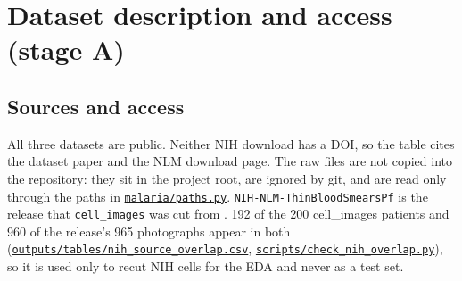 \documentclass[11pt,a4paper]{article}
\begin{document}
\section{Dataset description and access (stage A)}

\subsection{Sources and access}

All three datasets are public. Neither NIH download has a DOI, so the table cites the dataset paper and the NLM download page. The raw files are not copied into the repository: they sit in the project root, are ignored by git, and are read only through the paths in \href{https://gitlab.uvt.nl/capstone/2026-fall/u927271/-/blob/v1.0-final/malaria/paths.py}{\texttt{malaria/\allowbreak{}paths.\allowbreak{}py}}. \texttt{NIH-NLM-ThinBloodSmearsPf} is the release that \texttt{cell\_\allowbreak{}images} was cut from \citep{kassim2021}. 192 of the 200 cell\_\allowbreak{}images patients and 960 of the release's 965 photographs appear in both (\href{https://gitlab.uvt.nl/capstone/2026-fall/u927271/-/blob/v1.0-final/outputs/tables/nih_source_overlap.csv}{\texttt{outputs/\allowbreak{}tables/\allowbreak{}nih\_\allowbreak{}source\_\allowbreak{}overlap.\allowbreak{}csv}}, \href{https://gitlab.uvt.nl/capstone/2026-fall/u927271/-/blob/v1.0-final/scripts/check_nih_overlap.py}{\texttt{scripts/\allowbreak{}check\_\allowbreak{}nih\_\allowbreak{}overlap.\allowbreak{}py}}), so it is used only to recut NIH cells for the EDA and never as a test set.
\end{document}
